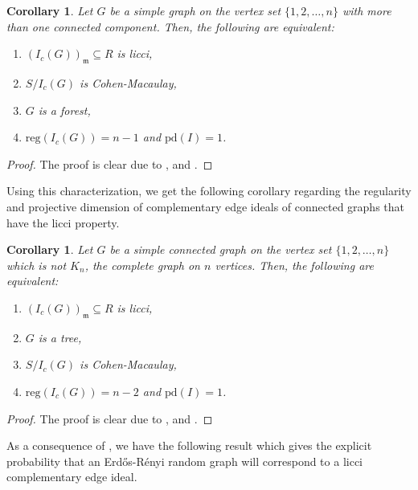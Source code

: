 \documentclass[oneside, 12pt]{amsart} \topmargin      -10mm \textwidth      160 true mm
\newtheorem{cor}[theorem]{Corollary}
\theoremstyle{definition}
\numberwithin{equation}{section}
\begin{document}
\begin{cor}\label{cor1}
Let $G$ be a simple graph on the vertex set $\{1,2,\dots,n\}$ with more than one connected component. Then, the following are equivalent:
\begin{enumerate}
    \item  $(I_c(G))_\mathfrak{m} \subseteq R$ is licci,
    \item $S/I_c(G)$ is Cohen-Macaulay,
\item $G$ is a forest,
\item $\mathrm{reg}(I_c(G))=n-1$ and $\mathrm{pd}(I)=1$.
\end{enumerate}
\end{cor}
\begin{proof}
The proof is clear due to ,  and .     
\end{proof}

Using this characterization, we get the following corollary regarding the regularity and projective dimension of complementary edge ideals of connected graphs that have the licci property. 
\begin{cor}\label{cor 2}
Let $G$ be a simple connected graph on the vertex set $\{1,2,\dots,n\}$ which is not $K_n$, the complete graph on $n$ vertices. Then, the following are equivalent:
\begin{enumerate}
    \item  $(I_c(G))_\mathfrak{m} \subseteq R$ is licci,
\item $G$ is a tree,
\item $S/I_c(G)$ is Cohen-Macaulay,
\item $\mathrm{reg}(I_c(G))=n-2$ and $\mathrm{pd}(I)=1$.
\end{enumerate}
\end{cor}
\begin{proof}
The proof is clear due to ,  and . 
\end{proof}
\noindent As a consequence of , we have the following result which gives the explicit probability that an Erd\H{o}s-Rényi random graph will correspond to a licci complementary edge ideal.
\end{document}

